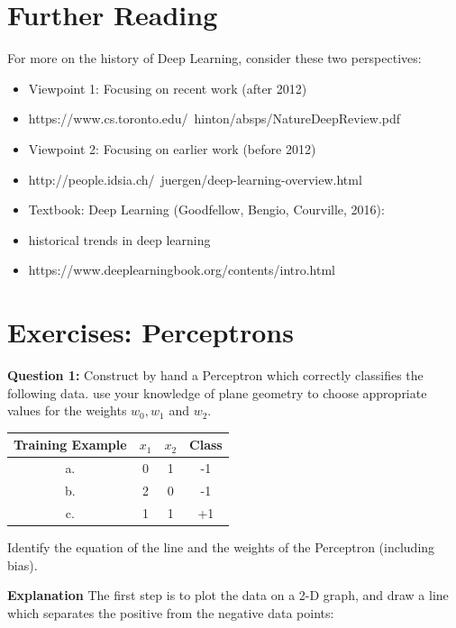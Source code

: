 \documentclass[11pt]{article}
\begin{document}
\section{Further Reading}\label{sec:further-reading}
For more on the history of Deep Learning, consider these two perspectives:

\begin{itemize}
    \item Viewpoint 1: Focusing on recent work (after 2012)
    \item https://www.cs.toronto.edu/~hinton/absps/NatureDeepReview.pdf
    \item Viewpoint 2: Focusing on earlier work (before 2012)
    \item http://people.idsia.ch/~juergen/deep-learning-overview.html
    \item Textbook: Deep Learning (Goodfellow, Bengio, Courville, 2016):
    \item historical trends in deep learning
    \item https://www.deeplearningbook.org/contents/intro.html
\end{itemize}

\pagebreak

\section{Exercises: Perceptrons}\label{sec:exercises:-perceptrons}

\textbf{Question 1:}
Construct by hand a Perceptron which correctly classifies the following data.
use your knowledge of plane geometry to choose appropriate values for the weights \(w_0, w_1\) and \(w_2\).

\begin{center}
\begin{tabular}{ |c|c|c|c| }
    \hline
    \textbf{Training Example} & \textbf{\(x_1\)} & \textbf{\(x_2\)} & \textbf{Class} \\
    \hline
    a. & 0 & 1 & -1 \\
    b. & 2 & 0 & -1 \\
    c. & 1 & 1 & +1 \\
    \hline
\end{tabular}
\end{center}

Identify the equation of the line and the weights of the Perceptron (including bias).

\textbf{Explanation}
The first step is to plot the data on a 2-D graph, and draw a line which separates the positive from the negative data points:
\end{document}
